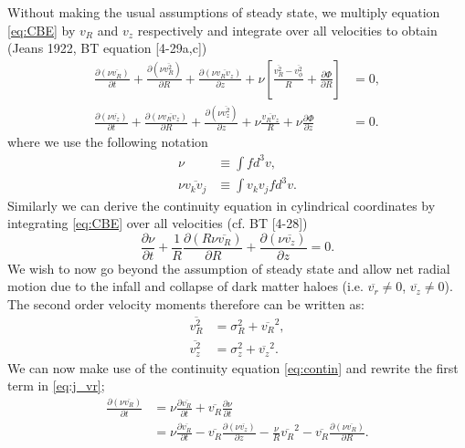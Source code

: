Without making the usual assumptions of steady state, we multiply equation \ref{eq:CBE} by $v_{R}$ and $v_z$ respectively and integrate over all velocities to obtain (Jeans 1922, BT equation [4-29a,c])
\begin{align} \label{eq:j_vr}
\frac{\partial (\nu \overline{v_R})}{\partial t} + \frac{\partial (\nu \overline{v_R^2})}{\partial R} + \frac{\partial (\nu \overline{v_R v_z})}{\partial z} + \nu \left[ \frac{\overline{v_R^2} - \overline{v_{\phi}^2}}{R} + \frac{\partial \Phi}{\partial R}\right] &= 0,\\ \label{eq:j_vz}
\frac{\partial (\nu \overline{v_z})}{\partial t} + \frac{\partial (\nu \overline{v_R v_z})}{\partial R} + \frac{\partial (\nu \overline{v_z^2})}{\partial z} + \nu \frac{\overline{v_R v_z}}{R} + \nu \frac{\partial \Phi}{\partial z}&= 0.
\end{align}
where we use the following notation
\begin{align}
\nu &\equiv \int f d^3 v, \\
\nu \overline{v_k v_j} &\equiv \int v_k v_j f d^3 v .
\end{align}
Similarly we can derive the continuity equation in cylindrical coordinates by integrating \ref{eq:CBE} over all velocities (cf. BT [4-28])
\begin{equation} \label{eq:contin}
\frac{\partial \nu}{\partial t} + \frac{1}{R}\frac{\partial (R \nu \overline{v_R})}{\partial R} + \frac{\partial (\nu \overline{v_z})}{\partial z} = 0.
\end{equation}
We wish to now go beyond the assumption of steady state and allow net radial motion due to the infall and collapse of dark matter haloes (i.e. $\overline{v_r} \neq 0$, $\overline{v_z} \neq 0$). The second order velocity moments therefore can be written as:
\begin{align} \label{eq:vr}
\overline{v_R^2} &= \sigma_R^2 + \overline{v_R}^2, \\ \label{eq:vz}
\overline{v_z^2} &= \sigma_z^2 + \overline{v_z}^2.
\end{align}
We can now make use of the continuity equation \ref{eq:contin} and rewrite the first term in \ref{eq:j_vr};
\begin{align}
\frac{\partial ( \nu \overline{v_R})}{\partial t} &= \nu \frac{\partial \overline{v_R}}{\partial t} + \overline{v_R} \frac{\partial \nu}{\partial t} \\
&= \nu \frac{\partial \overline{v_R}}{\partial t} - \overline{v_R}\frac{\partial (\nu \overline{v_z})}{\partial z} - \frac{\nu}{R}\overline{v_R}^2 - \overline{v_R} \frac{\partial (\nu \overline{v_R})}{\partial R}.
\end{align}
